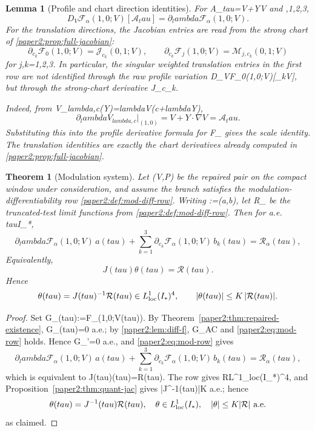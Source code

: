 \documentclass[11pt]{amsart}
\def\({}%
\def\){}%
\def\tau{tau}%
\def\lambda{lambda}%
\theoremstyle{plain}
\newtheorem{theorem}{Theorem}[section]
\newtheorem{lemma}[lemma]{Lemma}
\theoremstyle{definition}
\theoremstyle{remark}
\newcommand{\nn}{\nabla}
\begin{document}
\begin{lemma}[Profile and chart direction identities]\label{paper2:lem:profile-direction}
For \(\mathcal A_\tau=V+Y\cdot\nn V\) and \(,1,2,3\),
\[
D_V\mathcal F_\alpha(1,0;V)[\mathcal A_\tau]
=\partial_\lambda\mathcal F_\alpha(1,0;V).
\]
For the translation directions, the Jacobian entries are read from the strong
chart of \cref{paper2:prop:full-jacobian}:
\[
\partial_{c_k}\mathcal F_0(1,0;V)=\mathcal J_{c_k}(0,1;V),
\qquad
\partial_{c_k}\mathcal F_j(1,0;V)=\mathcal M_{j,c_k}(0,1;V)
\]
for \(j,k=1,2,3\).  In particular, the singular weighted translation entries in
the first row are not identified through the raw profile variation
\(D_V\mathcal F_0(1,0;V)[\partial_kV]\), but through the strong-chart
derivative \(\mathcal J_{c_k}\).

Indeed, from \(V_{\lambda,c}(Y)=\lambda V(c+\lambda Y)\),
\[
\partial_\lambda V_{\lambda,c}\big|_{(1,0)}=V+Y\cdot\nabla V=\mathcal A_\tau.
\]
Substituting this into the profile derivative formula for \(\mathcal F_\alpha\)
gives the scale identity.  The translation identities are exactly the chart
derivatives already computed in \cref{paper2:prop:full-jacobian}.
\end{lemma}

\begin{theorem}[Modulation system]\label{paper2:thm:mod-sys}
Let \((V,P)\) be the repaired pair on the compact window under consideration,
and assume the branch satisfies the modulation-differentiability row
\cref{paper2:def:mod-diff-row}. Writing \(\theta:=(a,b)\), let
\(\mathcal R_\alpha\) be the truncated-test limit functions from
\cref{paper2:def:mod-diff-row}.
Then for a.e. \(\tau\in I_*\),
\[
\partial_\lambda\mathcal F_\alpha(1,0;V)\,a(\tau)
+\sum_{k=1}^3\partial_{c_k}\mathcal F_\alpha(1,0;V)\,b_k(\tau)
=\mathcal R_\alpha(\tau),
\]
Equivalently,
\[
J(\tau)\theta(\tau)=\mathcal R(\tau).
\]
Hence
\[
\theta(\tau)=J(\tau)^{-1}\mathcal R(\tau)\in L^1_{\rm loc}(I_*)^4,
\qquad |\theta(\tau)|\le K\,|\mathcal R(\tau)|.
\]
\end{theorem}

\begin{proof}
Set \(G_\alpha(\tau):=\mathcal F_\alpha(1,0;V(\tau))\). By Theorem~\ref{paper2:thm:repaired-existence},
\(G_\alpha(\tau)=0\) a.e.; by \cref{paper2:lem:diff-f}, \(G_\alpha\in AC\) and
\eqref{paper2:eq:mod-row} holds. Hence \(G_\alpha'=0\) a.e., and
\eqref{paper2:eq:mod-row} gives
\[
\partial_\lambda\mathcal F_\alpha(1,0;V)\,a(\tau)
+\sum_{k=1}^3\partial_{c_k}\mathcal F_\alpha(1,0;V)\,b_k(\tau)
=\mathcal R_\alpha(\tau),
\]
which is equivalent to \(J(\tau)\theta(\tau)=\mathcal R(\tau)\).
The row gives \(\mathcal R\in L^1_{\rm loc}(I_*)^4\), and
Proposition~\ref{paper2:thm:quant-jac} gives \(|J^{-1}(\tau)|\le K\) a.e.; hence
\[
\theta(\tau)=J^{-1}(\tau)\mathcal R(\tau),\quad
\theta\in L^1_{\rm loc}(I_*),\quad |\theta|\le K|\mathcal R|\text{ a.e.}
\]
as claimed.
\end{proof}
\end{document}
